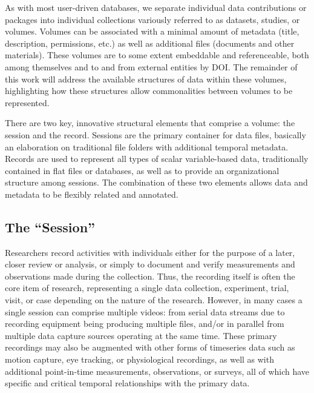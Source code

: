 \documentclass{sig-alternate}
\begin{document}
As with most user-driven databases, we separate individual data contributions or packages into individual collections variously referred to as datasets, studies, or volumes.
Volumes can be associated with a minimal amount of metadata (title, description, permissions, etc.) as well as additional files (documents and other materials).
These volumes are to some extent embeddable and referenceable, both among themselves and to and from external entities by DOI.
The remainder of this work will address the available structures of data within these volumes, highlighting how these structures allow commonalities between volumes to be represented.


There are two key, innovative structural elements that comprise a volume: the session and the record.
Sessions are the primary container for data files, basically an elaboration on traditional file folders with additional temporal metadata.
Records are used to represent all types of scalar variable-based data, traditionally contained in flat files or databases, as well as to provide an organizational structure among sessions.
The combination of these two elements allows data and metadata to be flexibly related and annotated.

\subsection{The ``Session''}

Researchers record activities with individuals either for the purpose of a later, closer review or analysis, or simply to document and verify measurements and observations made during the collection.
Thus, the recording itself is often the core item of research, representing a single data collection, experiment, trial, visit, or case depending on the nature of the research.
However, in many cases a single session can comprise multiple videos: from serial data streams due to recording equipment being producing multiple files, and/or in parallel from multiple data capture sources operating at the same time.
These primary recordings may also be augmented with other forms of timeseries data such as motion capture, eye tracking, or physiological recordings, as well as with additional point-in-time measurements, observations, or surveys, all of which have specific and critical temporal relationships with the primary data.
\end{document}
